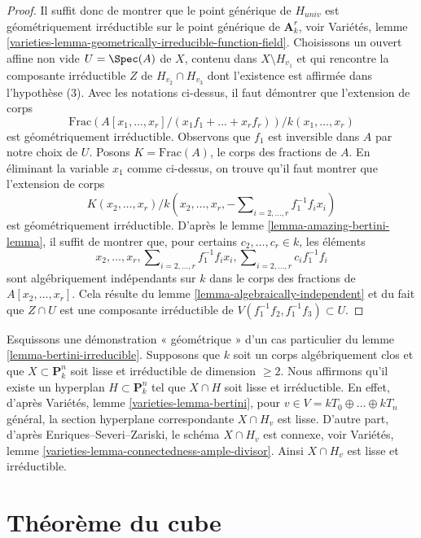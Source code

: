 \begin{proof}
\medskip\noindent
Il suffit donc de montrer que le point générique de $H_{univ}$
est géométriquement irréductible sur le point générique de $\mathbf{A}^r_k$, voir
Variétés, lemme
\ref{varieties-lemma-geometrically-irreducible-function-field}.
Choisissons un ouvert affine non vide $U = \Spec(A)$ de $X$,
contenu dans $X \setminus H_{v_1}$ et qui rencontre la composante
irréductible $Z$ de $H_{v_2} \cap H_{v_3}$ dont l'existence est affirmée dans
l'hypothèse (3). Avec les notations ci-dessus, il faut démontrer que
l'extension de corps
$$
\text{Frac}(A[x_1, \ldots, x_r]/(x_1f_1 + \ldots + x_rf_r))/
k(x_1, \ldots , x_r)
$$
est géométriquement irréductible. Observons que $f_1$ est inversible dans $A$
par notre choix de $U$.
Posons $K = \text{Frac}(A)$, le corps des fractions de $A$.
En éliminant la variable $x_1$ comme ci-dessus,
on trouve qu'il faut montrer que l'extension de corps
$$
K(x_2, \ldots, x_r)/
k(x_2, \ldots, x_r, -\sum\nolimits_{i = 2, \ldots, r} f_1^{-1}f_i x_i)
$$
est géométriquement irréductible. D'après le lemme \ref{lemma-amazing-bertini-lemma},
il suffit de montrer que, pour certains $c_2, \ldots, c_r \in k$, les éléments
$$
x_2, \ldots, x_r, \sum\nolimits_{i = 2, \ldots, r} f_1^{-1}f_i x_i,
\sum\nolimits_{i = 2, \ldots, r} c_if_1^{-1}f_i
$$
sont algébriquement indépendants sur $k$ dans le corps des fractions de
$A[x_2, \ldots, x_r]$. Cela résulte du
lemme \ref{lemma-algebraically-independent}
et du fait que $Z \cap U$ est une composante irréductible
de $V(f_1^{-1}f_2, f_1^{-1}f_3) \subset U$.
\end{proof}

\begin{remark}
\label{remark-geometric-proof-bertini-irreducible}
Esquissons une démonstration « géométrique » d'un cas particulier du
lemme \ref{lemma-bertini-irreducible}. Supposons que $k$
soit un corps algébriquement clos et que $X \subset \mathbf{P}^n_k$ soit lisse et
irréductible de dimension $\geq 2$. Nous affirmons qu'il existe un
hyperplan $H \subset \mathbf{P}^n_k$ tel que $X \cap H$ soit
lisse et irréductible. En effet, d'après
Variétés, lemme \ref{varieties-lemma-bertini},
pour $v \in V = kT_0 \oplus \ldots \oplus kT_n$ général,
la section hyperplane correspondante $X \cap H_v$ est lisse.
D'autre part, d'après Enriques--Severi--Zariski, le schéma
$X \cap H_v$ est connexe, voir
Variétés, lemme \ref{varieties-lemma-connectedness-ample-divisor}.
Ainsi $X \cap H_v$ est lisse et irréductible.
\end{remark}

\section{Théorème du cube}
\label{section-theorem-cube}

